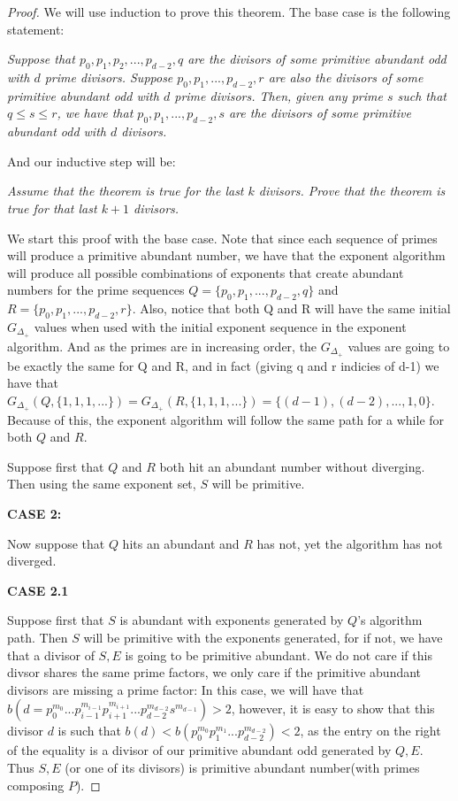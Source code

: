 \documentclass[../paper.tex]{subfiles}
\begin{document}
\begin{proof}
  We will use induction to prove this theorem. The base case is
the following statement:

  \textit{Suppose that $p_0, p_1, p_2, ..., 
p_{d-2}, q$ are the divisors of some primitive abundant
odd with $d$ prime divisors. Suppose $p_0, p_1, ..., p_{d-2},r$ 
are also the divisors of some primitive abundant odd
with $d$ prime divisors. Then, given any prime $s$ such that $q \leq s 
\leq r$, we have that $p_0, p_1,..., p_{d-2}, s$ are the 
divisors of some primitive abundant odd with $d$ divisors.}

And our inductive step will be:

  \textit{Assume that the theorem is true for the last $k$
divisors. Prove that the theorem is true for that last $k + 1$
divisors.}

We start this proof with the base case. Note that since each sequence
of primes will produce a primitive abundant number, we have that
the exponent algorithm will produce all possible combinations of
exponents that create abundant numbers for the prime sequences $Q = 
\{p_0, p_1, ..., p_{d-2}, q\}$ and $R = \{p_0, p_1, ..., p_{d-2},
r\}$. Also, notice that both Q and R will have the same initial
$G_{\Delta_+}$ values when used with the initial exponent sequence
in the exponent algorithm. And as the primes are in increasing
order, the $G_{\Delta_+}$ values are going to be exactly the same
for Q and R, and in fact (giving q and r indicies of d-1) we have
that $G_{\Delta_+}(Q, \{1,1,1,...\}) = G_{\Delta_+}(R,
\{1,1,1,...\}) = \{(d-1), (d-2), ..., 1, 0\}$. Because of this,
the exponent algorithm will follow the same path for a while for
both $Q$ and $R$.

Suppose first that $Q$ and $R$ both hit an abundant number without
diverging. Then using the same exponent set, $S$ will be
primitive.

\textbf{CASE 2:}

Now suppose that $Q$ hits an abundant and $R$ has not, yet the
algorithm has not diverged. 

\textbf{CASE 2.1}

Suppose first that $S$ is abundant
with exponents generated by $Q$'s algorithm path. Then $S$ will be
primitive with the exponents generated, for if not, we have that
a divisor of $S,E$ is going to be primitive abundant. We do not
care if this divsor shares the same prime factors, we only care if
the primitive abundant divisors are missing a prime factor: In
this case, we will have that $b(d = p_0^{m_0} ... p_{i-1}^{m_{i-1}}
p_{i + 1}^{m_{i+1}}... p_{d-2}^{m_{d-2}} s^{m_{d-1}}) > 2$,
however, it is easy to show that this divisor $d$ is such that
$b(d) < b(p_0^{m_0} p_1^{m_1} ... p_{d-2}^{m_{d-2}}) < 2$, as the
entry on the right of the equality is a divisor of our primitive
abundant odd generated by $Q,E$. Thus $S,E$ (or one of its
divisors) is primitive abundant number(with primes composing $P$).


\end{proof}
\end{document}
